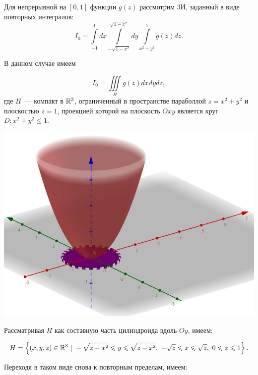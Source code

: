 \documentclass[../../main.tex]{subfiles}
\begin{document}
	\begin{example}
		Для непрерывной на $\left[0, 1\right]$ функции $g\left(z \right)$ рассмотрим 
		3И, заданный в виде повторных интегралов:
			\[I_0 = \int\limits_{-1}^1dx\int\limits_{-\sqrt{1 - x^2}}^{\sqrt{1 - 
			x^2}}dy\int\limits_{x^2 + y^2}^1 g\left(z\right)dz.\]
		
		В данном случае имеем
		
		\[I_0 = \iiint\limits_{H} g(z) dxdydz,\]
		где $H$~--- компакт в $\mathbb{R}^3$, ограниченный в пространстве параболлой $z = 
		x^2 + 
		y^2$ и плоскостью $z = 1$, проекцией которой на плоскость $Oxy$ является 
		круг $D: x^2 + y^2 \leq 1$.
		
		\begin{center}
		\includegraphics[scale = 0.7]{lec14.jpg}
		\end{center}
		
		Рассматривая $H$ как составную часть цилиндроида вдоль $Oy$, имеем:
		
		\[H = \left\{\left(x, y, z\right) \in \mathbb{R}^3 \ |\ -\sqrt{z - x^2} \leqslant y 
		\leqslant \sqrt{z - x^2},\ -\sqrt{z} \leqslant x \leqslant \sqrt{z},\ 0 \leqslant z \leqslant 1 
		\right\}.\]
		
		Переходя в таком виде снова к повторным пределам, имеем:
		

\end{example}
\end{document}
